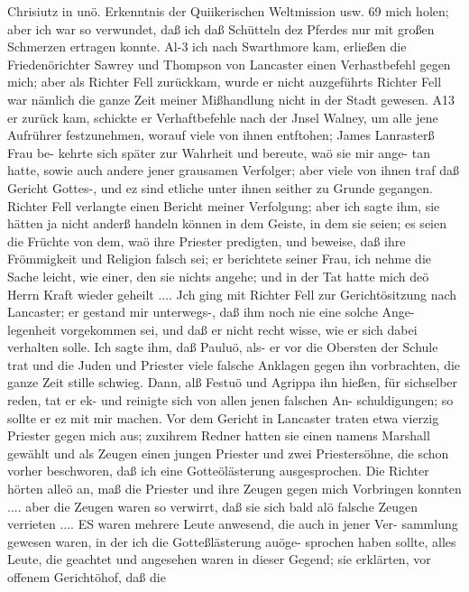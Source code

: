 Chrisiutz in unö. Erkenntnis der Quiikerischen Weltmission usw. 69
mich holen; aber ich war so verwundet, daß ich daß Schütteln
dez Pferdes nur mit großen Schmerzen ertragen konnte. Al-3 ich
nach Swarthmore kam, erließen die Friedenörichter Sawrey und
Thompson von Lancaster einen Verhastbefehl gegen mich; aber
als Richter Fell zurückkam, wurde er nicht auzgeführts Richter
Fell war nämlich die ganze Zeit meiner Mißhandlung nicht in
der Stadt gewesen. A13 er zurück kam, schickte er Verhaftbefehle
nach der Jnsel Walney, um alle jene Aufrührer festzunehmen,
worauf viele von ihnen entftohen; James Lanrasterß Frau be-
kehrte sich später zur Wahrheit und bereute, waö sie mir ange-
tan hatte, sowie auch andere jener grausamen Verfolger; aber
viele von ihnen traf daß Gericht Gottes-, und ez sind etliche unter
ihnen seither zu Grunde gegangen. Richter Fell verlangte einen
Bericht meiner Verfolgung; aber ich sagte ihm, sie hätten ja nicht
anderß handeln können in dem Geiste, in dem sie seien; es seien
die Früchte von dem, waö ihre Priester predigten, und beweise,
daß ihre Frömmigkeit und Religion falsch sei; er berichtete seiner
Frau, ich nehme die Sache leicht, wie einer, den sie nichts angehe;
und in der Tat hatte mich deö Herrn Kraft wieder geheilt ....
Jch ging mit Richter Fell zur Gerichtösitzung nach Lancaster;
er gestand mir unterwegs-, daß ihm noch nie eine solche Ange-
legenheit vorgekommen sei, und daß er nicht recht wisse, wie
er sich dabei verhalten solle. Ich sagte ihm, daß Pauluö, als-
er vor die Obersten der Schule trat und die Juden und Priester
viele falsche Anklagen gegen ihn vorbrachten, die ganze Zeit stille
schwieg. Dann, alß Festuö und Agrippa ihn hießen, für sichselber
reden, tat er ek- und reinigte sich von allen jenen falschen An-
schuldigungen; so sollte er ez mit mir machen. Vor dem Gericht
in Lancaster traten etwa vierzig Priester gegen mich aus; zuxihrem
Redner hatten sie einen namens Marshall gewählt und als
Zeugen einen jungen Priester und zwei Priestersöhne, die schon
vorher beschworen, daß ich eine Gotteölästerung ausgesprochen.
Die Richter hörten alleö an, maß die Priester und ihre Zeugen
gegen mich Vorbringen konnten .... aber die Zeugen waren
so verwirrt, daß sie sich bald alö falsche Zeugen verrieten ....
ES waren mehrere Leute anwesend, die auch in jener Ver-
sammlung gewesen waren, in der ich die Gotteßlästerung auöge-
sprochen haben sollte, alles Leute, die geachtet und angesehen waren
in dieser Gegend; sie erklärten, vor offenem Gerichtöhof, daß die



